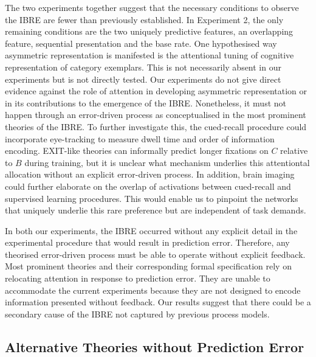 \documentclass[10pt,letterpaper]{article}
\begin{document}
The two experiments together suggest that the necessary conditions to observe the IBRE are fewer than previously established.
In Experiment 2, the only remaining conditions are the two uniquely predictive features, an overlapping feature, sequential presentation and the base rate.
One hypothesised way asymmetric representation is manifested is the attentional tuning of cognitive representation of category exemplars.
This is not necessarily absent in our experiments but is not directly tested.
Our experiments do not give direct evidence against the role of attention in developing asymmetric representation or in its contributions to the emergence of the IBRE.
Nonetheless, it must not happen through an error-driven process as conceptualised in the most prominent theories of the IBRE.
To further investigate this, the cued-recall procedure could incorporate eye-tracking to measure dwell time and order of information encoding.
EXIT-like theories can informally predict longer fixations on $C$ relative to $B$ during training, but it is unclear what mechanism underlies this attentiontal allocation without an explicit error-driven process.
In addition, brain imaging could further elaborate on the overlap of activations between cued-recall and supervised learning procedures.
This would enable us to pinpoint the networks that uniquely underlie this rare preference but are independent of task demands.

In both our experiments, the IBRE occurred without any explicit detail in the experimental procedure that would result in prediction error.
Therefore, any theorised error-driven process must be able to operate without explicit feedback.
Most prominent theories and their corresponding formal specification rely on relocating attention in response to prediction error.
They are unable to accommodate the current experiments because they are not designed to encode information presented without feedback.
Our results suggest that there could be a secondary cause of the IBRE not captured by previous process models.

\subsection{Alternative Theories without Prediction Error}
\end{document}
